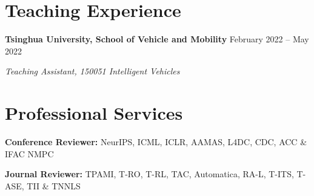 \documentclass[11pt,a4paper]{article}
\begin{document}
\section{Teaching Experience}
\textbf{Tsinghua University, School of Vehicle and Mobility} \hfill February 2022 -- May 2022\par
{\itshape Teaching Assistant, 150051 Intelligent Vehicles}

\section{Professional Services}
\textbf{Conference Reviewer:} NeurIPS, ICML, ICLR, AAMAS, L4DC, CDC, ACC \& IFAC NMPC\par
\vspace{2pt}
\textbf{Journal Reviewer:} TPAMI, T-RO, T-RL, TAC, Automatica, RA-L, T-ITS, T-ASE, TII \& TNNLS
\end{document}
